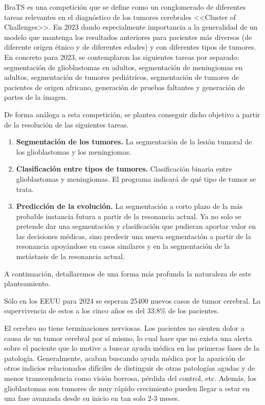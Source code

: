 BraTS es una competición que se define como un conglomerado de diferentes tareas relevantes en el diagnóstico de los tumores cerebrales <<Cluster of Challenges>>. En 2023 dando especialmente importancia a la generalidad de un modelo que mantenga los resultados anteriores para pacientes más diversos (de diferente origen étnico y de diferentes edades) y con diferentes tipos de tumores. En concreto para 2023, se contemplaron las siguientes tareas por separado: segmentación de glioblastomas en adultos, segmentación de meningiomas en adultos, segmentación de tumores pediátricos, segmentación de tumores de pacientes de origen africano, generación de pruebas faltantes y generación de partes de la imagen.

De forma análoga a esta competición, se plantea conseguir dicho objetivo a partir de la resolución de las siguientes tareas.

\begin{enumerate}
	\item \textbf{Segmentación de los tumores.} 
	La segmentación de la lesión tumoral de los glioblastomas y los meningiomas.
	\item \textbf{Clasificación entre tipos de tumores.} Clasificación binaria entre glioblastomas y meningiomas. El programa indicará de qué tipo de tumor se trata.
	\item \textbf{Predicción de la evolución.} La segmentación a corto plazo de la más probable instancia futura a partir de la resonancia actual. Ya no solo se pretende dar una segmentación y clasificación que pudieran aportar valor en las decisiones médicas, sino predecir una nueva segmentación a partir de la resonancia apoyándose en casos similares y en la segmentación de la metástasis de la resonancia actual.
\end{enumerate}

A continuación, detallaremos de una forma más profunda la naturaleza de este planteamiento.

Sólo en los EEUU para 2024 se esperan 25400 nuevos casos de tumor cerebral. La supervivencia de estos a los cinco años es del $33.8 \%$ de los pacientes. \cite{cancerorg}

El cerebro no tiene terminaciones nerviosas. Los pacientes no sienten dolor a causa de un tumor cerebral por sí mismo, lo cual hace que no exista una alerta sobre el paciente que lo motive a buscar ayuda médica en las primeras fases de la patología. Generalmente, acaban buscando ayuda médica por la aparición de otros indicios relacionados difíciles de distinguir de otras patologías agudas y de menor transcendencia como visión borrosa, pérdida del control, etc. Además, los glioblastomas son tumores de muy rápido crecimiento pueden llegar a estar en una fase avanzada desde su inicio en tan solo 2-3 meses.

